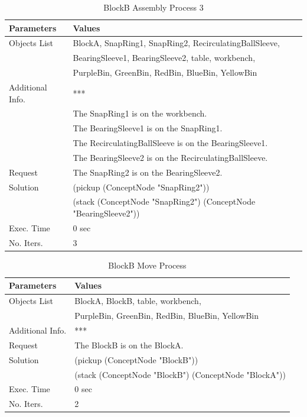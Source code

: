 \begin{table}[htbp]
  \centering
  \caption{BlockB Assembly Process 3}\label{tab:ass_B_3}
  \medskip
\begin{tabular}{ll}
\toprule
\textbf{Parameters} &  \textbf{Values}  \\
\midrule
\rowcolor{gray!25}
Objects List &  BlockA, SnapRing1, SnapRing2, RecirculatingBallSleeve, \\
\rowcolor{gray!25}
& BearingSleeve1, BearingSleeve2, table, workbench, \\
\rowcolor{gray!25}
&  PurpleBin, GreenBin, RedBin, BlueBin, YellowBin \\
Additional Info. & *** \\
& The SnapRing1 is on the workbench. \\
& The BearingSleeve1 is on the SnapRing1. \\
& The RecirculatingBallSleeve is on the BearingSleeve1. \\
& The BearingSleeve2 is on the RecirculatingBallSleeve. \\
\rowcolor{gray!25}
Request & The SnapRing2 is on the BearingSleeve2. \\
Solution & (pickup (ConceptNode "SnapRing2")) \\
& (stack (ConceptNode "SnapRing2") (ConceptNode "BearingSleeve2")) \\
\rowcolor{gray!25}
Exec. Time & 0 sec \\
No. Iters. & 3 \\	
\bottomrule
\end{tabular}
\end{table}

\begin{table}[htbp]
  \centering
  \caption{BlockB Move Process}\label{tab:ass_B_4}
  \medskip
\begin{tabular}{ll}
\toprule
\textbf{Parameters} &  \textbf{Values}  \\
\midrule
\rowcolor{gray!25}
Objects List &  BlockA, BlockB, table, workbench, \\
\rowcolor{gray!25}
&  PurpleBin, GreenBin, RedBin, BlueBin, YellowBin \\
Additional Info. & *** \\
\rowcolor{gray!25}
Request & The BlockB is on the BlockA. \\
Solution & (pickup (ConceptNode "BlockB")) \\
& (stack (ConceptNode "BlockB") (ConceptNode "BlockA")) \\
\rowcolor{gray!25}
Exec. Time & 0 sec \\
No. Iters. & 2 \\	
\bottomrule
\end{tabular}
\end{table}

